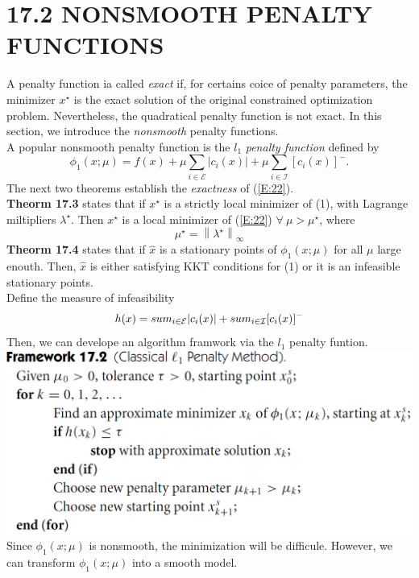 \documentclass[11pt,a4paper]{article}
\renewcommand{\(}{\left(}
\renewcommand{\)}{\right)}
\newcommand{\norm}[1]{\left\|#1\right\|}
\begin{document}
\section*{17.2 NONSMOOTH PENALTY FUNCTIONS}
A penalty function ia called {\em exact} if, for certains coice of penalty parameters, the minimizer $x^\star$ is the exact solution of the original constrained optimization problem. Nevertheless, the quadratical penalty function is not exact. In this section, we introduce the {\em nonsmooth} penalty functions.\\
A popular nonsmooth penalty function is the $l_1$ {\em penalty function} defined by
\begin{equation}\label{E:22}
\phi_1(x;\mu)=f(x)+\mu\sum_{i \in \mathcal{E}}|c_i(x)|+\mu\sum_{i \in \mathcal{I}}[c_i(x)]^-.
\end{equation}
The next two theorems establish the {\em exactness} of (\ref{E:22}).\\
\textbf{Theorm 17.3} states that if $x^\star$ is a strictly local minimizer of (1), with Lagrange miltipliers $\lambda^\star$. Then $x^\star$ is a local minimizer of (\ref{E:22}) \quad$\forall~\mu > \mu^\star$, where
\begin{equation}\label{E:23} 
\mu^\star= \norm{\lambda^\star}_\infty 
\end{equation}
\textbf{Theorm 17.4} states that if $\hat{x}$ is a stationary points of $\phi_1(x;\mu)$ for all $\mu$ large enouth. Then, $\hat{x}$ is either satisfying KKT conditions for (1) or it is an infeasible stationary points.\\
Define the measure of infeasibility
\begin{equation}\label{E:27}
 h(x)=\\sum_{i \in \mathcal{E}}|c_i(x)|+\\sum_{i \in \mathcal{I}}[c_i(x)]^- 
\end{equation}
Then, we can develope an algorithm framwork via the $l_1$ penalty funtion.\\
\includegraphics[scale=0.33]{fram17_2}\\
Since $\phi_1(x;\mu)$ is nonsmooth, the minimization will be difficule. However, we can transform $\phi_1(x;\mu)$ into a smooth model.
\end{document}
